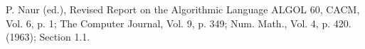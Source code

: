 \begin{thebibliography}{99}


P. Naur (ed.), Revised Report on the Algorithmic Language ALGOL 60, CACM, Vol.
6, p. 1; The Computer Journal, Vol. 9, p. 349; Num. Math., Vol. 4, p. 420.
(1963); Section 1.1.


\end{thebibliography}
